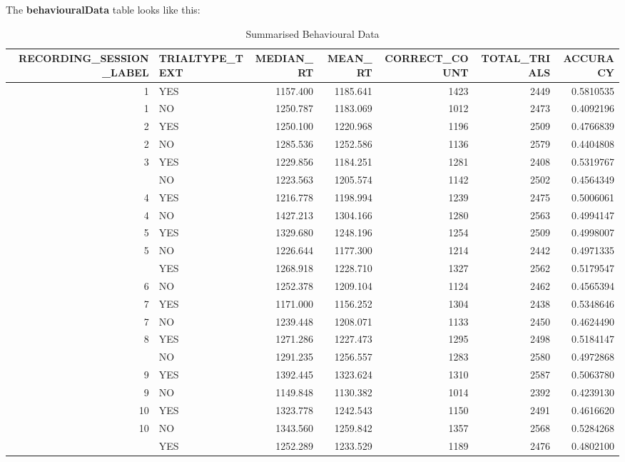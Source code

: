 \documentclass[]{book}
\begin{document}
The \textbf{behaviouralData} table looks like this:

\begin{table}[t]

\caption{\label{tab:unnamed-chunk-32}Summarised Behavioural Data}
\centering
\fontsize{10}{12}\selectfont
\begin{tabular}{rlrrrrr}
\toprule
RECORDING\_SESSION\_LABEL & TRIALTYPE\_TEXT & MEDIAN\_RT & MEAN\_RT & CORRECT\_COUNT & TOTAL\_TRIALS & ACCURACY\\
\midrule
1 & YES & 1157.400 & 1185.641 & 1423 & 2449 & 0.5810535\\
1 & NO & 1250.787 & 1183.069 & 1012 & 2473 & 0.4092196\\
2 & YES & 1250.100 & 1220.968 & 1196 & 2509 & 0.4766839\\
2 & NO & 1285.536 & 1252.586 & 1136 & 2579 & 0.4404808\\
3 & YES & 1229.856 & 1184.251 & 1281 & 2408 & 0.5319767\\
\addlinespace
3 & NO & 1223.563 & 1205.574 & 1142 & 2502 & 0.4564349\\
4 & YES & 1216.778 & 1198.994 & 1239 & 2475 & 0.5006061\\
4 & NO & 1427.213 & 1304.166 & 1280 & 2563 & 0.4994147\\
5 & YES & 1329.680 & 1248.196 & 1254 & 2509 & 0.4998007\\
5 & NO & 1226.644 & 1177.300 & 1214 & 2442 & 0.4971335\\
\addlinespace
6 & YES & 1268.918 & 1228.710 & 1327 & 2562 & 0.5179547\\
6 & NO & 1252.378 & 1209.104 & 1124 & 2462 & 0.4565394\\
7 & YES & 1171.000 & 1156.252 & 1304 & 2438 & 0.5348646\\
7 & NO & 1239.448 & 1208.071 & 1133 & 2450 & 0.4624490\\
8 & YES & 1271.286 & 1227.473 & 1295 & 2498 & 0.5184147\\
\addlinespace
8 & NO & 1291.235 & 1256.557 & 1283 & 2580 & 0.4972868\\
9 & YES & 1392.445 & 1323.624 & 1310 & 2587 & 0.5063780\\
9 & NO & 1149.848 & 1130.382 & 1014 & 2392 & 0.4239130\\
10 & YES & 1323.778 & 1242.543 & 1150 & 2491 & 0.4616620\\
10 & NO & 1343.560 & 1259.842 & 1357 & 2568 & 0.5284268\\
\addlinespace
11 & YES & 1252.289 & 1233.529 & 1189 & 2476 & 0.4802100\\

\end{tabular}
\end{table}
\end{document}
